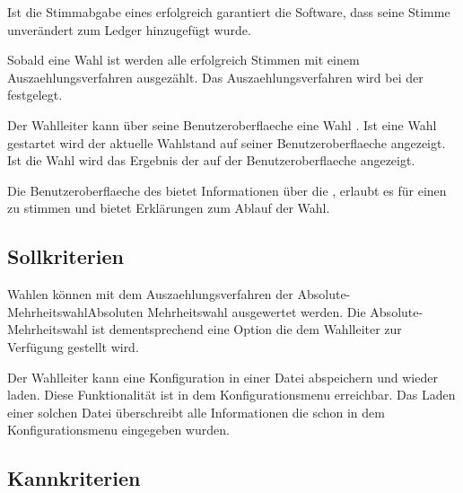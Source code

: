 \documentclass[parskip=full,11pt,twoside]{scrartcl}
\begin{document}
Ist die \gls{Stimmabgabe} eines  erfolgreich garantiert die Software, dass seine \gls{Stimme} unverändert zum \gls{Ledger} hinzugefügt wurde.

Sobald eine \gls{Wahl}  ist werden alle erfolgreich  Stimmen mit einem \gls{Auszaehlungsverfahren} ausgezählt. Das \gls{Auszaehlungsverfahren} wird bei der  festgelegt.

Der \gls{Wahlleiter} kann über seine \gls{Benutzeroberflaeche} eine Wahl . Ist eine \gls{Wahl} gestartet wird der aktuelle \gls{Wahlstand} auf seiner \gls{Benutzeroberflaeche} angezeigt. Ist die Wahl  wird das Ergebnis der  auf der \gls{Benutzeroberflaeche} angezeigt.

Die \gls{Benutzeroberflaeche} des  bietet Informationen über die , erlaubt es für einen  zu stimmen und bietet Erklärungen zum Ablauf der Wahl.

\subsection{Sollkriterien}

Wahlen können mit dem \gls{Auszaehlungsverfahren} der \gls{Absolute-Mehrheitswahl}{Absoluten Mehrheitswahl} ausgewertet werden. Die \gls{Absolute-Mehrheitswahl} ist dementsprechend eine Option die dem \gls{Wahlleiter} zur Verfügung gestellt wird.

Der \gls{Wahlleiter} kann eine \gls{Konfiguration} in einer Datei abspeichern und wieder laden. Diese Funktionalität ist in dem \gls{Konfigurationsmenu} erreichbar. Das Laden einer solchen Datei überschreibt alle Informationen die schon in dem \gls{Konfigurationsmenu} eingegeben wurden.

\subsection{Kannkriterien}
\end{document}
